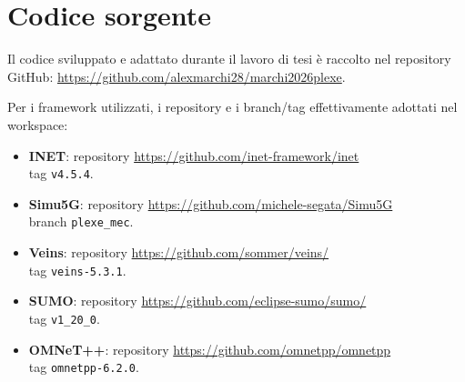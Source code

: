\section{Codice sorgente}
\label{ch:source_code}

Il codice sviluppato e adattato durante il lavoro di tesi è raccolto nel repository GitHub:
\url{https://github.com/alexmarchi28/marchi2026plexe}.

Per i framework utilizzati, i repository e i branch/tag effettivamente adottati nel workspace:
\begin{itemize}
\item \textbf{INET}: repository \url{https://github.com/inet-framework/inet}\\tag \texttt{v4.5.4}.
\item \textbf{Simu5G}: repository \url{https://github.com/michele-segata/Simu5G}\\branch \texttt{plexe\_mec}.
\item \textbf{Veins}: repository \url{https://github.com/sommer/veins/}\\tag \texttt{veins-5.3.1}.
\item \textbf{SUMO}: repository \url{https://github.com/eclipse-sumo/sumo/}\\tag \texttt{v1\_20\_0}.
\item \textbf{OMNeT++}: repository \url{https://github.com/omnetpp/omnetpp}\\tag \texttt{omnetpp-6.2.0}.
\end{itemize}
